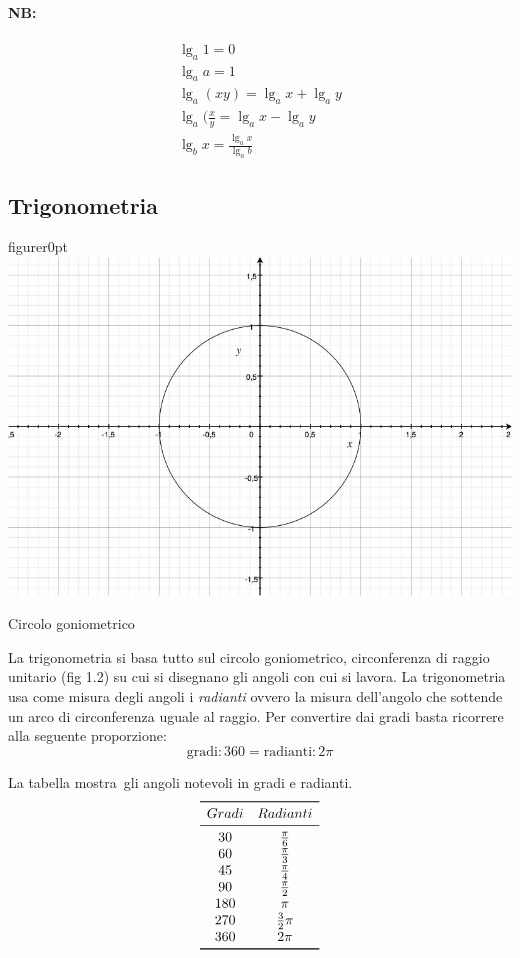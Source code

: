  \paragraph{NB:}
  \begin{gather}
   {\lg}_a 1=0\\
   {\lg}_a a=1\\
   {\lg}_a (xy)= {\lg}_a x + {\lg}_a y\\
   {\lg}_a (\frac{x}{y}={\lg}_a x - {\lg}_a y\\
   {\lg}_b x=\frac{{\lg}_a x}{{\lg}_a b}
  \end{gather}

 \subsection{Trigonometria}
\begin{wrapfloat}{figure}{r}{0pt}
\includegraphics[width=0.5\columnwidth]{Trigonometria}
\caption{Circolo goniometrico}
\end{wrapfloat}
La trigonometria si basa tutto sul circolo goniometrico, circonferenza di raggio unitario (fig 1.2) su cui si disegnano gli angoli con cui si lavora.
La trigonometria usa come misura degli angoli i \textit{radianti} ovvero la misura dell'angolo che sottende un arco di circonferenza uguale al raggio. Per convertire dai gradi basta ricorrere alla seguente proporzione:
\[
\text{gradi}:360=\text{radianti}:2\pi
\]

La tabella mostra~gli angoli notevoli in gradi e radianti.\\

\[\begin{array}{cc}
\toprule
Gradi   & Radianti \\
\midrule
30 & \frac{\pi}{6} \\
60 & \frac{\pi}{3} \\
45 & \frac{\pi}{4} \\
90 & \frac{\pi}{2} \\
180 & \pi \\
270 & \frac{3}{2}\pi \\
360 & 2\pi \\
\bottomrule
\end{array}\]
 

